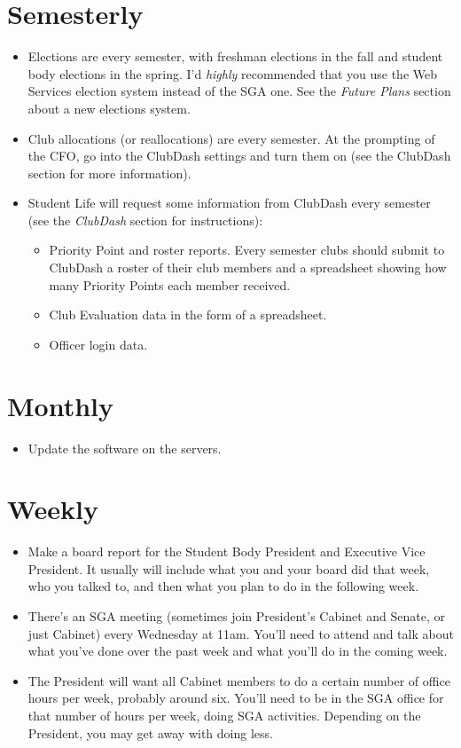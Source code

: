 \documentclass[11pt]{report}
\begin{document}
	\section{Semesterly}
		\begin{itemize}
			\item{Elections are every semester, with freshman elections in the fall and student body elections in the spring. I'd \textit{highly} recommended that you use the Web Services election system instead of the SGA one. See the \textit{Future Plans} section about a new elections system.}
			\item{Club allocations (or reallocations) are every semester. At the prompting of the CFO, go into the ClubDash settings and turn them on (see the ClubDash section for more information).}
			\item{
				Student Life will request some information from ClubDash every semester (see the \textit{ClubDash} section for instructions):
				\begin{itemize}
					\item{Priority Point and roster reports. Every semester clubs should submit to ClubDash a roster of their club members and a spreadsheet showing how many Priority Points each member received.}
					\item{Club Evaluation data in the form of a spreadsheet.}
					\item{Officer login data.}
				\end{itemize}
			}
		\end{itemize}

	\section{Monthly}
		\begin{itemize}
			\item{Update the software on the servers.}	
		\end{itemize}


	\section{Weekly}
		\begin{itemize}
			\item{Make a board report for the Student Body President and Executive Vice President. It usually will include what you and your board did that week, who you talked to, and then what you plan to do in the following week.}	
			\item{There's an SGA meeting (sometimes join President's Cabinet and Senate, or just Cabinet) every Wednesday at 11am. You'll need to attend and talk about what you've done over the past week and what you'll do in the coming week.}
			\item{The President will want all Cabinet members to do a certain number of office hours per week, probably around six. You'll need to be in the SGA office for that number of hours per week, doing SGA activities. Depending on the President, you may get away with doing less.}
		\end{itemize}
\end{document}
